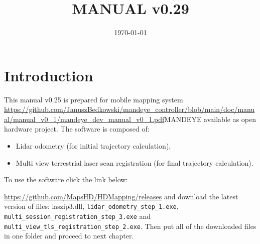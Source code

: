 \documentclass[a4paper,12pt]{book}
\begin{document}
\author{}
\title{MANUAL v0.29}
\date{\today}

\frontmatter
\maketitle
\tableofcontents

\mainmatter

\chapter{Introduction}
This manual v0.25 is prepared for mobile mapping system \url{https://github.com/JanuszBedkowski/mandeye_controller/blob/main/doc/manual/manual_v0_1/mandeye_dev_manual_v0_1.pdf}{MANDEYE} available as open hardware project.
The software is composed of:
\begin{itemize}
	\item Lidar odometry (for initial trajectory calculation),
	\item Multi view terrestrial laser scan registration (for final trajectory calculation).
\end{itemize}
To use the software click the link below:

\url{https://github.com/MapsHD/HDMapping/releases}
\linebreak
and download the latest version of files: laszip3.dll, \verb|lidar_odometry_step_1.exe|, \verb|multi_session_registration_step_3.exe|  and \verb|multi_view_tls_registration_step_2.exe|.
Then put all of the downloaded files in one folder and proceed to next chapter.













\backmatter
\end{document}
